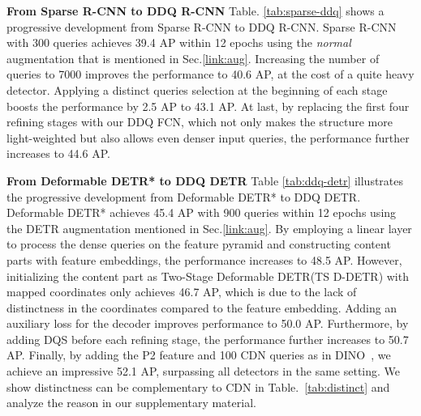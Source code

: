 \documentclass[10pt,twocolumn,letterpaper]{article}
\begin{document}
\noindent\textbf{From Sparse R-CNN to DDQ R-CNN} Table. \ref{tab:sparse-ddq} shows a progressive development from Sparse R-CNN to DDQ R-CNN. Sparse R-CNN with 300 queries achieves 39.4 AP within 12 epochs using the \emph{normal} augmentation that is mentioned in Sec.\ref{link:aug}. Increasing the number of queries to 7000 improves the performance to 40.6 AP, at the cost of a quite heavy detector. Applying a distinct queries selection at the beginning of each stage boosts the performance by 2.5 AP to 43.1 AP. At last, by replacing the first four refining stages with our DDQ FCN, which not only makes the structure more light-weighted but also allows even denser input queries, the performance further increases to 44.6 AP.


\begin{table}[!h]
    \centering
    \caption{\textbf{From Sparse R-CNN to DDQ R-CNN}. Q means the query, and DQS stands for the distinct queries selection }
\vspace{-3mm}
    \label{tab:sparse-ddq}
\end{table}


\noindent\textbf{From Deformable DETR* to DDQ DETR} Table \ref{tab:ddq-detr} illustrates the progressive development from Deformable DETR* to DDQ DETR. Deformable DETR* achieves 45.4 AP with 900 queries within 12 epochs using the DETR augmentation mentioned in Sec.\ref{link:aug}. By employing a linear layer to process the dense queries on the feature pyramid and constructing content parts with feature embeddings, the performance increases to 48.5 AP. However, initializing the content part as Two-Stage Deformable DETR(TS D-DETR) with mapped coordinates only achieves 46.7 AP, which is due to the lack of distinctness in the coordinates compared to the feature embedding. Adding an auxiliary loss for the decoder improves performance to 50.0 AP. Furthermore, by adding DQS before each refining stage, the performance further increases to 50.7 AP. Finally, by adding the P2 feature and 100 CDN queries as in DINO~\cite{zhang2022dino}, we achieve an impressive 52.1 AP, surpassing all detectors in the same setting. We show  distinctness can be complementary to CDN in Table.~\ref{tab:distinct} and analyze the reason in our supplementary material.  
\end{document}

